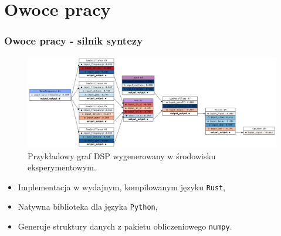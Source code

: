 \documentclass[]{beamer}
\begin{document}
\section{Owoce pracy}
\begin{frame}
  \frametitle{Owoce pracy - silnik syntezy}

  \vspace{-0.5cm}

  \begin{figure}
    \centering
    \includegraphics[width=0.8\linewidth]{example_synth.png}
    \caption{Przykładowy graf DSP wygenerowany w środowisku eksperymentowym.}
  \end{figure}

  \vspace{-0.5cm}

  \begin{itemize}
    \item Implementacja w wydajnym, kompilowanym języku \texttt{Rust},
    \item Natywna biblioteka dla języka \texttt{Python},
    \item Generuje struktury danych z pakietu obliczeniowego \texttt{numpy}.
  \end{itemize}
\end{frame}
\end{document}
